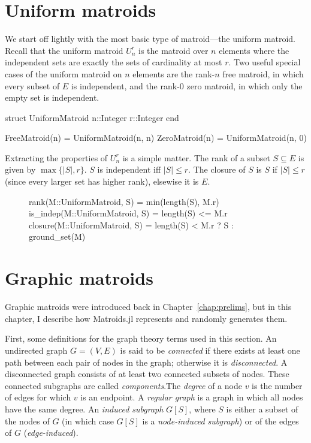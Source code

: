 \section{Uniform matroids}
We start off lightly with the most basic type of matroid---the uniform matroid. Recall that the uniform matroid $U_n^r$ is the matroid over $n$ elements where the independent sets are exactly the sets of cardinality at most $r$. Two useful special cases of the uniform matroid on $n$ elements are the rank-$n$ free matroid, in which every subset of $E$ is independent, and the rank-$0$ zero matroid, in which only the empty set is independent.

\begin{jllisting}
struct UniformMatroid
  n::Integer
  r::Integer
end

FreeMatroid(n) = UniformMatroid(n, n)
ZeroMatroid(n) = UniformMatroid(n, 0)
\end{jllisting}

Extracting the properties of $U_n^r$ is a simple matter. The rank of a subset $S\subseteq E$ is given by $\max\{|S|, r\}$. $S$ is independent iff $|S|\leq r$. The closure of $S$ is $S$ if $|S| \leq r$ (since every larger set has higher rank), elsewise it is $E$.
\begin{figure}[ht!]
\begin{jllisting}    
rank(M::UniformMatroid, S) = min(length(S), M.r)
is_indep(M::UniformMatroid, S) = length(S) <= M.r
closure(M::UniformMatroid, S) = length(S) < M.r ? S : ground_set(M)
\end{jllisting}
\end{figure}

\section{Graphic matroids}
Graphic matroids were introduced back in Chapter~\ref{chap:prelims}, but in this chapter, I describe how Matroids.jl represents and randomly generates them.

First, some definitions for the graph theory terms used in this section. An undirected graph $G=(V,E)$ is said to be \textit{connected} if there exists at least one path between each pair of nodes in the graph; otherwise it is \textit{disconnected}. A disconnected graph consists of at least two connected subsets of nodes. These connected subgraphs are called \textit{components}.The \textit{degree} of a node $v$ is the number of edges for which $v$ is an endpoint. A \textit{regular graph} is a graph in which all nodes have the same degree. An \textit{induced subgraph} $G[S]$, where $S$ is either a subset of the nodes of $G$ (in which case $G[S]$ is a \textit{node-induced subgraph}) or of the edges of $G$ (\textit{edge-induced}).

